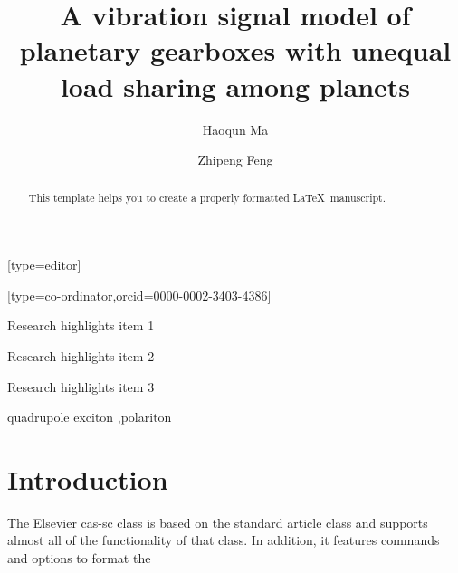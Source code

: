 \documentclass[a4paper,fleqn]{cas-sc}
\begin{document}
\let\WriteBookmarks\relax
\def\floatpagepagefraction{1}
\def\textpagefraction{.001}

\title[mode = title]{A vibration signal model of planetary gearboxes with unequal load sharing among planets}
\author[1]{Haoqun Ma}[type=editor]
\address[1]{University of Science and Technology Beijing, No.30, Xueyuan Road, Haidian District, Beijing.}
\author[1]{Zhipeng Feng}[type=co-ordinator,orcid=0000-0002-3403-4386]
\cormark[1]
\begin{abstract}
    This template helps you to create a properly formatted \LaTeX\ manuscript.
\end{abstract}
\begin{highlights}
    \item Research highlights item 1
    \item Research highlights item 2
    \item Research highlights item 3
\end{highlights}
\begin{keywords}
    quadrupole exciton \sep polariton
\end{keywords}
    
\maketitle
\section{Introduction}

The Elsevier cas-sc class is based on the
standard article class and supports almost all of the functionality of
that class. In addition, it features commands and options to format the
\end{document}
